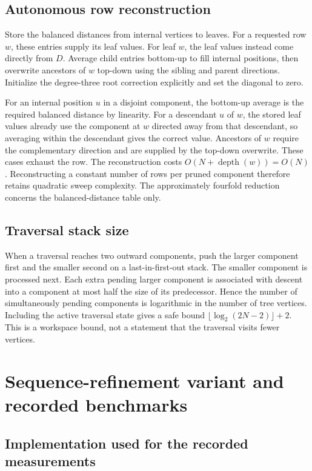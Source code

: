 \subsection{Autonomous row reconstruction}

Store the balanced distances from internal vertices to leaves.
For a requested row $w$, these entries supply its leaf values.
For leaf $w$, the leaf values instead come directly from $D$.
Average child entries bottom-up to fill internal positions, then overwrite ancestors of $w$ top-down using the sibling and parent directions.
Initialize the degree-three root correction explicitly and set the diagonal to zero.

For an internal position $u$ in a disjoint component, the bottom-up average is the required balanced distance by linearity.
For a descendant $u$ of $w$, the stored leaf values already use the component at $w$ directed away from that descendant, so averaging within the descendant gives the correct value.
Ancestors of $w$ require the complementary direction and are supplied by the top-down overwrite.
These cases exhaust the row.
The reconstruction costs $O(N+\operatorname{depth}(w))=O(N)$.
Reconstructing a constant number of rows per pruned component therefore retains quadratic sweep complexity.
The approximately fourfold reduction concerns the balanced-distance table only.

\subsection{Traversal stack size}

When a traversal reaches two outward components, push the larger component first and the smaller second on a last-in-first-out stack.
The smaller component is processed next.
Each extra pending larger component is associated with descent into a component at most half the size of its predecessor.
Hence the number of simultaneously pending components is logarithmic in the number of tree vertices.
Including the active traversal state gives a safe bound
$\lfloor\log_2(2N-2)\rfloor+2$.
This is a workspace bound, not a statement that the traversal visits fewer vertices.

\section{Sequence-refinement variant and recorded benchmarks}
\label{sec:sequence_variant}

\subsection{Implementation used for the recorded measurements}

